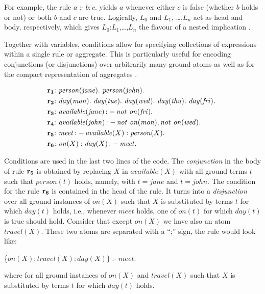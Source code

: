\documentclass[a4paper, titlepage]{article}
\DeclareMathOperator{\leftimpl}{:-}
\DeclareMathOperator{\nott}{\mathit{not}}
\newcommand\mycenterline[1]{\par\smallskip\centerline{#1} \smallskip}
\newcommand{\row}[1]{%
  \ensuremath{\color{black}\ensuremath{\mathbf{#1}} \color{black}}%
}
\newcommand{\rowprefix}[1]{%
  \ensuremath{\color{black}\mathbf{#1{:}}\ }%
}
\begin{document}
For example, the rule $\mathit{a \leftimpl b : c.}$ yields 
$a$ whenever either $c$ is false (whether $b$ holds or not) 
or both $b$ and $c$ are true. Logically, $L_0$ and $L_1$,
\dots,$L_n$ act as head and body, respectively, which gives 
$L_0$:$L_1$,\dots,$L_n$ the flavour of a nested implication 
\cite{gkklorst2015}.

Together  with variables, conditions allow for specifying 
collections of expressions within a single rule or 
aggregate. This is particularly useful for encoding 
conjunctions (or disjunctions) over arbitrarily many ground 
atoms as well as for the compact representation of 
aggregates \cite{gkklorst2015}. 
\begin{exmp}
\begin{align*}
\rowprefix{r_1}& \mathit{person}(\mathit{jane}). \  \mathit{person}
(\mathit{john}).\\
\rowprefix{r_2}& \mathit{day}(\mathit{mon}). \ \mathit{day}
(\mathit{tue}). \ \mathit{day}(\mathit{wed}). \ \mathit{day}
(\mathit{thu}). \ \mathit{day}(\mathit{fri}). \ \\
\rowprefix{r_3}& \mathit{available}(\mathit{jane}) \leftimpl \nott \thinspace  
\mathit{on}(\mathit{fri}).\\
\rowprefix{r_4}& \mathit{available}(\mathit{john}) \leftimpl 
\nott \thinspace \mathit{on}(\mathit{mon}), \nott \thinspace \mathit{on}(\mathit{wed}).\\
\rowprefix{r_5}& \mathit{meet} \leftimpl \mathit{available}(X) : 
\mathit{person}(X).\\
\rowprefix{r_6}& \mathit{on}(X) : \mathit{day}(X) \leftimpl 
\mathit{meet}.
\end{align*}
\end{exmp}  
Conditions are used in the last two lines of the code. 
The \emph{conjunction} in the body of rule $\row{r_5}$ is obtained by 
replacing $X$ in $\mathit{available(X)}$ with all ground 
terms $t$ such that $\mathit{person(t)}$ holds, namely, 
with $\mathit{t=jane}$ and $\mathit{t=john}$. The condition 
for the rule $\row{r_6}$ is contained in the head of the rule. It 
turns into a \emph{disjunction} over all ground instances of 
$\mathit{on(X)}$ such that $X$ is substituted by terms $t$ 
for which $\mathit{day(t)}$ holds, i.e., whenever $\mathit{meet}$ holds, one of $\mathit{on(t)}$ for which $\mathit{day(t)}$ is true should hold. Consider that except $\mathit{on(X)}$ we have also an atom $\mathit{travel(X)}$. These two atoms are separated with a ``;'' sign, the rule would look like:
\mycenterline{\{$\mathit{on}(X);\mathit{travel}(X) : \mathit{day}(X)\} \leftimpl 
\mathit{meet}.$}
where for all ground instances of $\mathit{on(X)}$ and $\mathit{travel(X)}$ such that $X$ is substituted by terms $t$ for which $\mathit{day(t)}$ holds. 
\end{document}
